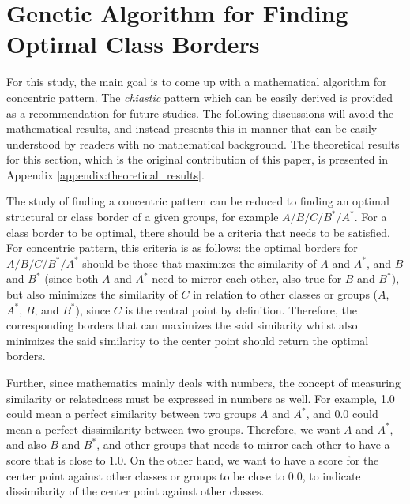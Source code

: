 \section{Genetic Algorithm for Finding Optimal Class Borders}\label{sec:result_ga}
For this study, the main goal is to come up with a mathematical algorithm for concentric pattern. The \textit{chiastic} pattern which can be easily derived is provided as a recommendation for future studies. The following discussions will avoid the mathematical results, and instead presents this in manner that can be easily understood by readers with no mathematical background. The theoretical results for this section, which is the original contribution of this paper, is presented in Appendix \ref{appendix:theoretical_results}.

The study of finding a concentric pattern can be reduced to finding an optimal structural or class border of a given groups, for example $A/B/C/B^*/A^*$. For a class border to be optimal, there should be a criteria that needs to be satisfied. For concentric pattern, this criteria is as follows: the optimal borders for $A/B/C/B^*/A^*$ should be those that maximizes the similarity of $A$ and $A^*$, and $B$ and $B^*$ (since both $A$ and $A^*$ need to mirror each other, also true for $B$ and $B^*$), but also minimizes the similarity of $C$ in relation to other classes or groups ($A$, $A^*$, $B$, and $B^*$), since $C$ is the central point by definition. Therefore, the corresponding borders that can maximizes the said similarity whilst also minimizes the said similarity to the center point should return the optimal borders. 

Further, since mathematics mainly deals with numbers, the concept of measuring similarity or relatedness must be expressed in numbers as well. For example, 1.0 could mean a perfect similarity between two groups $A$ and $A^*$, and 0.0 could mean a perfect dissimilarity between two groups. Therefore, we want $A$ and $A^*$, and also $B$ and $B^*$, and other groups that needs to mirror each other to have a score that is close to 1.0. On the other hand, we want to have a score for the center point against other classes or groups to be close to 0.0, to indicate dissimilarity of the center point against other classes.

